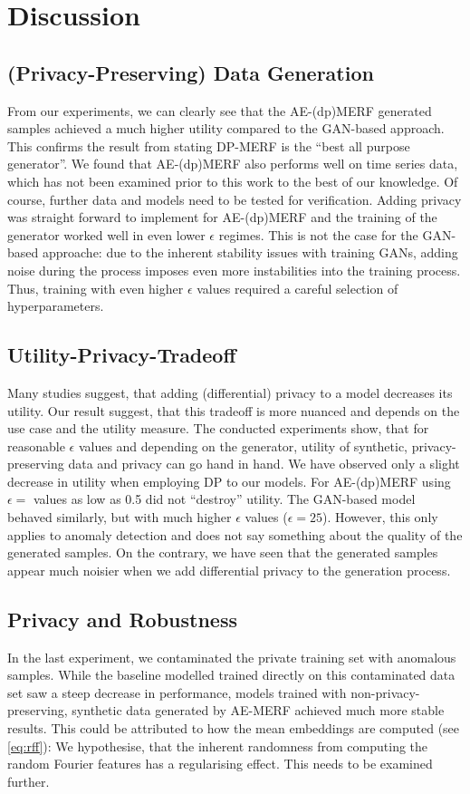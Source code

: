 \section{Discussion}

\subsection{(Privacy-Preserving) Data Generation}
From our experiments, we can clearly see that the AE-(dp)MERF generated samples achieved a much higher utility compared to the GAN-based approach. This confirms the result from \parencite{hu2023sok} stating DP-MERF is the ``best all purpose generator''. We found that AE-(dp)MERF also performs well on time series data, which has not been examined prior to this work to the best of our knowledge. Of course, further data and models need to be tested for verification. Adding privacy was straight forward to implement for AE-(dp)MERF and the training of the generator worked well in even lower $\epsilon$ regimes. This is not the case for the GAN-based approache: due to the inherent stability issues with training GANs, adding noise during the process imposes even more instabilities into the training process. Thus, training with even higher \(\epsilon\) values required a careful selection of hyperparameters.


\subsection{Utility-Privacy-Tradeoff}

Many studies suggest, that adding (differential) privacy to a model decreases its utility. Our result suggest, that this tradeoff is more nuanced and depends on the use case and the utility measure. The conducted experiments show, that for reasonable $\epsilon$ values and depending on the generator, utility of synthetic, privacy-preserving data and privacy can go hand in hand. We have observed only a slight decrease in utility when employing DP to our models. For AE-(dp)MERF using $\epsilon=$ values as low as 0.5 did not ``destroy'' utility. The GAN-based model behaved similarly, but with much higher \(\epsilon\) values ($\epsilon=25$). However, this only applies to anomaly detection and does not say something about the quality of the generated samples. On the contrary, we have seen that the generated samples appear much noisier when we add differential privacy to the generation process.

\subsection{Privacy and Robustness}
In the last experiment, we contaminated the private training set with anomalous samples. While the baseline modelled trained directly on this contaminated data set saw a steep decrease in performance, models trained with non-privacy-preserving, synthetic data generated by AE-MERF achieved much more stable results. This could be attributed to how the mean embeddings are computed (see \cref{eq:rff}): We hypothesise, that the inherent randomness from computing the random Fourier features has a regularising effect. This needs to be examined further.

